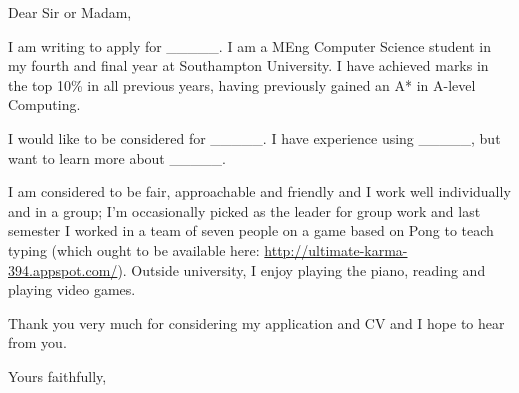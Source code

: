\documentclass[a4paper, margin=0.3in]{letter}
\begin{document}
\begin{letter}{}

\opening{Dear Sir or Madam,}

I am writing to apply for _____. I am a MEng Computer Science student in my
fourth and final year at Southampton University. I have achieved marks in the
top 10\% in all previous years, having previously gained an A* in A-level
Computing.

I would like to be considered for _____. I have experience using _____, but
want to learn more about _____.

I am considered to be fair, approachable and friendly and I work well
individually and in a group; I'm occasionally picked as the leader for group
work and last semester I worked in a team of seven people on a game based on
Pong to teach typing (which ought to be available here:
\url{http://ultimate-karma-394.appspot.com/}). Outside university, I enjoy
playing the piano, reading and playing video games.

Thank you very much for considering my application and CV and I hope to hear
from you.

\closing{Yours faithfully,}

\end{letter}
\end{document}
